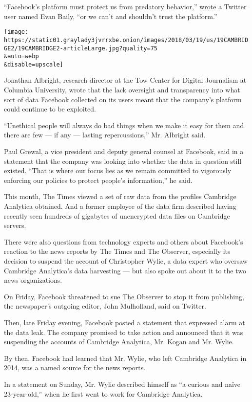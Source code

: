 ``Facebook's platform must protect us from predatory behavior,''
\href{https://twitter.com/evanbaily/status/975020550035779590}{wrote} a
Twitter user named Evan Baily, ``or we can't and shouldn't trust the
platform.''

\texttt{[image: https://static01.graylady3jvrrxbe.onion/images/2018/03/19/us/19CAMBRIDGE2/19CAMBRIDGE2-articleLarge.jpg?quality=75\\\&auto=webp\\\&disable=upscale]}

Jonathan Albright, research director at the Tow Center for Digital
Journalism at Columbia University, wrote that the lack oversight and
transparency into what sort of data Facebook collected on its users
meant that the company's platform could continue to be exploited.

``Unethical people will always do bad things when we make it easy for
them and there are few --- if any --- lasting repercussions,'' Mr.
Albright said.

Paul Grewal, a vice president and deputy general counsel at Facebook,
said in a statement that the company was looking into whether the data
in question still existed. ``That is where our focus lies as we remain
committed to vigorously enforcing our policies to protect people's
information,'' he said.

This month, The Times viewed a set of raw data from the profiles
Cambridge Analytica obtained. And a former employee of the data firm
described having recently seen hundreds of gigabytes of unencrypted data
files on Cambridge servers.

There were also questions from technology experts and others about
Facebook's reaction to the news reports by The Times and The Observer,
especially its decision to suspend the account of Christopher Wylie, a
data expert who oversaw Cambridge Analytica's data harvesting --- but
also spoke out about it to the two news organizations.

On Friday, Facebook threatened to sue The Observer to stop it from
publishing, the newspaper's outgoing editor, John Mulholland, said on
Twitter.

Then, late Friday evening, Facebook posted a statement that expressed
alarm at the data leak. The company promised to take action and
announced that it was suspending the accounts of Cambridge Analytica,
Mr. Kogan and Mr. Wylie.

By then, Facebook had learned that Mr. Wylie, who left Cambridge
Analytica in 2014, was a named source for the news reports.

In a statement on Sunday, Mr. Wylie described himself as ``a curious and
naïve 23-year-old,'' when he first went to work for Cambridge Analytica.

